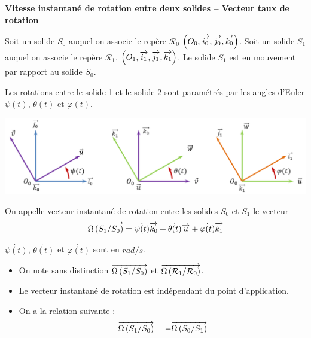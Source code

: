 \documentclass[10pt,oneside]{article}
\begin{document}
\begin{defi}
\textbf{Vitesse instantané de rotation entre deux solides -- Vecteur taux de rotation}

Soit un solide $S_0$ auquel on associe le repère $\mathcal{R}_0$ $\left(O_0,\overrightarrow{i_0},\overrightarrow{j_0},\overrightarrow{k_0} \right)$.  Soit un solide $S_1$ auquel on associe le repère $\mathcal{R}_1$,  $\left(O_1,\overrightarrow{i_1},\overrightarrow{j_1},\overrightarrow{k_1} \right)$. Le solide $S_1$ est en mouvement par rapport au solide $S_0$. 


\begin{minipage}[c]{.3\linewidth} 
Les rotations entre le solide 1 et le solide 2 sont paramétrés par les angles d'Euler $\psi(t)$, $\theta(t)$ et $\varphi(t)$.
\end{minipage}\hfill
\begin{minipage}[c]{.65\linewidth}
\begin{center}
\includegraphics[width=\textwidth]{png/euler}
\end{center}
\end{minipage}

\vspace{.25cm}

On appelle vecteur instantané de rotation entre les solides $S_0$ et $S_1$ le vecteur
$$
\overrightarrow{\Omega\left( {S_1}/{S_0}\right)} = \dot{\psi(t)} \overrightarrow{k_0} + \dot{\theta(t)} \overrightarrow{u} + \dot{\varphi(t)} \overrightarrow{k_1}
$$

$\dot{\psi(t)} $, $\dot{\theta(t)} $ et $\dot{\varphi(t)} $ sont en $rad/s$. 
\end{defi}

\begin{rem}

\begin{itemize}
\item On note sans distinction $\overrightarrow{\Omega\left( {S_1}/{S_0}\right)}$ et $\overrightarrow{\Omega\left( {\mathcal{R}_1}/{\mathcal{R}_0}\right)}$.
\item Le vecteur instantané de rotation est indépendant du point d'application.
\item On a la relation suivante :
$$\overrightarrow{\Omega\left( {S_1}/{S_0}\right)} = -\overrightarrow{\Omega\left( {S_0}/{S_1}\right)}$$
\end{itemize}
\end{rem}
\end{document}
